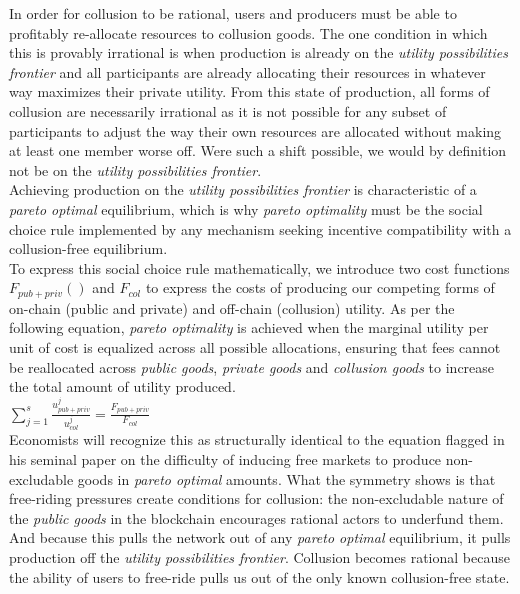 \documentclass[11pt,a4paper]{llncs}
\begin{document}
In order for collusion to be rational, users and producers must be able to profitably re-allocate resources to collusion goods. The one condition in which this is provably irrational is when production is already on the \textit{utility possibilities frontier} and all participants are already allocating their resources in whatever way maximizes their private utility. From this state of production, all forms of collusion are necessarily irrational as it is not possible for any subset of participants to adjust the way their own resources are allocated without making at least one member worse off. Were such a shift possible, we would by definition not be on the \textit{utility possibilities frontier}.
\vspace{0.2cm} \\
Achieving production on the \textit{utility possibilities frontier} is characteristic of a \textit{pareto optimal} equilibrium, which is why \textit{pareto optimality} must be the social choice rule implemented by any mechanism seeking incentive compatibility with a collusion-free equilibrium.
\vspace{0.2cm} \\
To express this social choice rule mathematically, we introduce two cost functions $F_{{pub} + {priv}}()$ and $F_{col}$ to express the costs of producing our competing forms of on-chain (public and private) and off-chain (collusion) utility. As per the following equation, \textit{pareto optimality} is achieved when the marginal utility per unit of cost is equalized across all possible allocations, ensuring that fees cannot be reallocated across \textit{public goods}, \textit{private goods} and \textit{collusion goods} to increase the total amount of utility produced.
\vspace{0.2cm} \\
\LARGE
\begin{math}
\sum_{j=1}^{s} \frac{u_{{pub}+{priv}}^j}{u_{col}^j} = \frac{F_{{pub} + {priv}}}{F_{col}}
\end{math}
\normalsize
\vspace{0.2cm} \\
Economists will recognize this as structurally identical to the equation \cite{samuelson1954pure} flagged in his seminal paper on the difficulty of inducing free markets to produce non-excludable goods in \textit{pareto optimal} amounts. What the symmetry shows is that free-riding pressures create conditions for collusion: the non-excludable nature of the \textit{public goods} in the blockchain encourages rational actors to underfund them. And because this pulls the network out of any \textit{pareto optimal} equilibrium, it pulls production off the \textit{utility possibilities frontier}. Collusion becomes rational because the ability of users to free-ride pulls us out of the only known collusion-free state.
\end{document}
